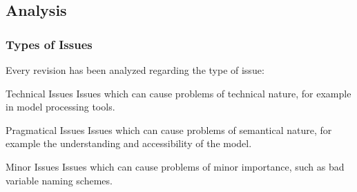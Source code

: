 \documentclass[10pt]{beamer}
\begin{document}
\subsection{Analysis}
\begin{frame}
\frametitle{Types of Issues}
Every revision has been analyzed regarding the type of issue:
\begin{block}{Technical Issues}
Issues which can cause problems of technical nature, for example in model
processing tools.
\end{block}
\begin{block}{Pragmatical Issues}
Issues which can cause problems of semantical nature, for example the
understanding and accessibility of the model.
\end{block}
\begin{block}{Minor Issues}
Issues which can cause problems of minor importance, such as
bad variable naming schemes.
\end{block}
\end{frame}
\end{document}
